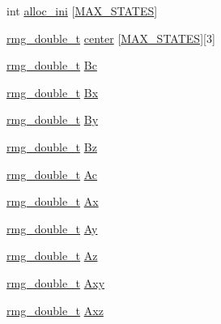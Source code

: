 \begin{DoxyCompactItemize}
\item 
int \hyperlink{struct_c_o_n_t_r_o_l_a4585a09145b763033c23563dcebb56ad}{alloc\-\_\-ini} \mbox{[}\hyperlink{_t_d_d_f_t_2_headers_2params_8h_a9568de9296df1e94aeb0b7f24cc678a9}{M\-A\-X\-\_\-\-S\-T\-A\-T\-E\-S}\mbox{]}
\item 
\hyperlink{rmgtypes_8h_aaa16921c14f121c56eaa42390a340db8}{rmg\-\_\-double\-\_\-t} \hyperlink{struct_c_o_n_t_r_o_l_abb9da84a9a218b887da69d8b598bd727}{center} \mbox{[}\hyperlink{_t_d_d_f_t_2_headers_2params_8h_a9568de9296df1e94aeb0b7f24cc678a9}{M\-A\-X\-\_\-\-S\-T\-A\-T\-E\-S}\mbox{]}\mbox{[}3\mbox{]}
\item 
\hyperlink{rmgtypes_8h_aaa16921c14f121c56eaa42390a340db8}{rmg\-\_\-double\-\_\-t} \hyperlink{struct_c_o_n_t_r_o_l_a231b29e8aa17ca24d398be11215c5334}{Bc}
\item 
\hyperlink{rmgtypes_8h_aaa16921c14f121c56eaa42390a340db8}{rmg\-\_\-double\-\_\-t} \hyperlink{struct_c_o_n_t_r_o_l_a1c90b20a48762030bc43209f048730c7}{Bx}
\item 
\hyperlink{rmgtypes_8h_aaa16921c14f121c56eaa42390a340db8}{rmg\-\_\-double\-\_\-t} \hyperlink{struct_c_o_n_t_r_o_l_a0b05dea9af8e77e282d961d57e74a51a}{By}
\item 
\hyperlink{rmgtypes_8h_aaa16921c14f121c56eaa42390a340db8}{rmg\-\_\-double\-\_\-t} \hyperlink{struct_c_o_n_t_r_o_l_a9a63d2eb1ce385b15ac8def4d1eb94e1}{Bz}
\item 
\hyperlink{rmgtypes_8h_aaa16921c14f121c56eaa42390a340db8}{rmg\-\_\-double\-\_\-t} \hyperlink{struct_c_o_n_t_r_o_l_ab0e0b475caa0e17a561ec8a0b20546f7}{Ac}
\item 
\hyperlink{rmgtypes_8h_aaa16921c14f121c56eaa42390a340db8}{rmg\-\_\-double\-\_\-t} \hyperlink{struct_c_o_n_t_r_o_l_a5dd931d3531d43df21b87ff29dd4512d}{Ax}
\item 
\hyperlink{rmgtypes_8h_aaa16921c14f121c56eaa42390a340db8}{rmg\-\_\-double\-\_\-t} \hyperlink{struct_c_o_n_t_r_o_l_aca897fb756ce776a0d86c462d428f384}{Ay}
\item 
\hyperlink{rmgtypes_8h_aaa16921c14f121c56eaa42390a340db8}{rmg\-\_\-double\-\_\-t} \hyperlink{struct_c_o_n_t_r_o_l_a54f13ef19114e064943c9404aebc9908}{Az}
\item 
\hyperlink{rmgtypes_8h_aaa16921c14f121c56eaa42390a340db8}{rmg\-\_\-double\-\_\-t} \hyperlink{struct_c_o_n_t_r_o_l_a8a34a43e77c44faab04079033bc2e280}{Axy}
\item 
\hyperlink{rmgtypes_8h_aaa16921c14f121c56eaa42390a340db8}{rmg\-\_\-double\-\_\-t} \hyperlink{struct_c_o_n_t_r_o_l_aef16615599f197d1c983a402a66c7e64}{Axz}

\end{DoxyCompactItemize}
